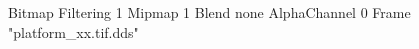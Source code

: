 {Bitmap
	{Filtering 1}
	{Mipmap 1}
	{Blend none}
	{AlphaChannel 0}
	{Frame "platform_xx.tif.dds"}
}
